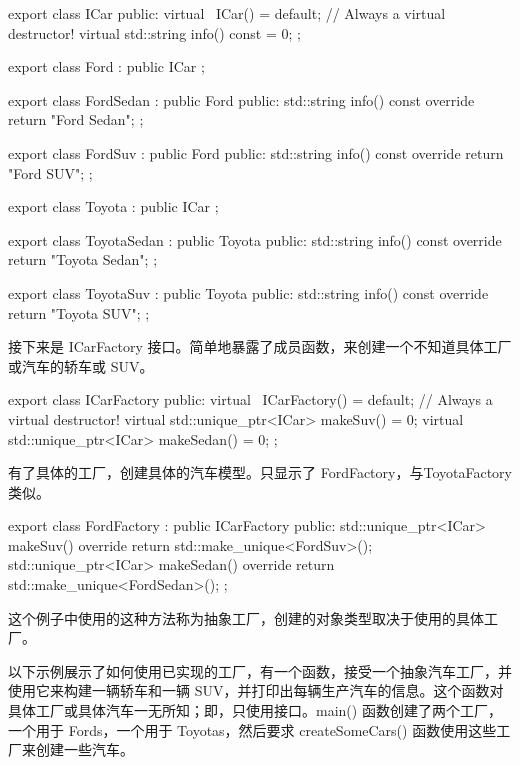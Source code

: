 \begin{cpp}
export class ICar
{
    public:
    virtual ~ICar() = default; // Always a virtual destructor!
    virtual std::string info() const = 0;
};

export class Ford : public ICar { };

export class FordSedan : public Ford
{
    public:
    std::string info() const override { return "Ford Sedan"; }
};

export class FordSuv : public Ford
{
    public:
    std::string info() const override { return "Ford SUV"; }
};

export class Toyota : public ICar { };

export class ToyotaSedan : public Toyota
{
    public:
    std::string info() const override { return "Toyota Sedan"; }
};

export class ToyotaSuv : public Toyota
{
    public:
    std::string info() const override { return "Toyota SUV"; }
};
\end{cpp}

接下来是 ICarFactory 接口。简单地暴露了成员函数，来创建一个不知道具体工厂或汽车的轿车或 SUV。

\begin{cpp}
export class ICarFactory
{
    public:
        virtual ~ICarFactory() = default; // Always a virtual destructor!
        virtual std::unique_ptr<ICar> makeSuv() = 0;
        virtual std::unique_ptr<ICar> makeSedan() = 0;
};
\end{cpp}

有了具体的工厂，创建具体的汽车模型。只显示了 FordFactory，与ToyotaFactory 类似。

\begin{cpp}
export class FordFactory : public ICarFactory
{
    public:
        std::unique_ptr<ICar> makeSuv() override {
            return std::make_unique<FordSuv>(); }
        std::unique_ptr<ICar> makeSedan() override {
            return std::make_unique<FordSedan>(); }
};
\end{cpp}

这个例子中使用的这种方法称为抽象工厂，创建的对象类型取决于使用的具体工厂。


以下示例展示了如何使用已实现的工厂，有一个函数，接受一个抽象汽车工厂，并使用它来构建一辆轿车和一辆 SUV，并打印出每辆生产汽车的信息。这个函数对具体工厂或具体汽车一无所知；即，只使用接口。main() 函数创建了两个工厂，一个用于 Fords，一个用于 Toyotas，然后要求 createSomeCars() 函数使用这些工厂来创建一些汽车。

